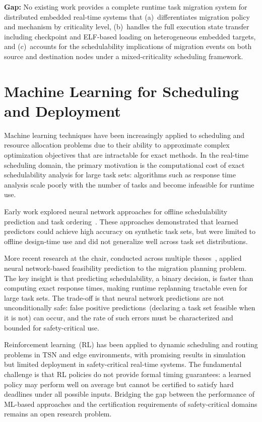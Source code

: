 \textbf{Gap:} No existing work provides a complete runtime task migration system for
distributed embedded real-time systems that (a)~differentiates migration policy and
mechanism by criticality level, (b)~handles the full execution state transfer
including checkpoint and ELF-based loading on heterogeneous embedded targets,
and (c)~accounts for the schedulability implications of migration events on both
source and destination nodes under a mixed-criticality scheduling framework.

\section{Machine Learning for Scheduling and Deployment}
\label{sec:rw_ml}

Machine learning techniques have been increasingly applied to scheduling and resource
allocation problems due to their ability to approximate complex optimization objectives
that are intractable for exact methods. In the real-time scheduling domain, the
primary motivation is the computational cost of exact schedulability analysis for
large task sets: algorithms such as response time analysis scale poorly with the
number of tasks and become infeasible for runtime use.

Early work explored neural network approaches for offline schedulability prediction
and task ordering~\cite{cardeira1994,dominguez2004}. These approaches demonstrated
that learned predictors could achieve high accuracy on synthetic task sets, but were
limited to offline design-time use and did not generalize well across task set
distributions.

More recent research at the chair, conducted across multiple theses~\cite{taieb1,
	utz1,blieninger1}, applied neural network-based feasibility prediction to the
migration planning problem. The key insight is that predicting schedulability, a
binary decision, is faster than computing exact response times, making runtime
replanning tractable even for large task sets. The trade-off is that neural network
predictions are not unconditionally safe: false positive predictions~(declaring a
task set feasible when it is not) can occur, and the rate of such errors must be
characterized and bounded for safety-critical use.

Reinforcement learning~(RL) has been applied to dynamic scheduling and routing
problems in TSN and edge environments, with promising results in simulation but
limited deployment in safety-critical real-time systems. The fundamental challenge
is that RL policies do not provide formal timing guarantees: a learned policy may
perform well on average but cannot be certified to satisfy hard deadlines under all
possible inputs. Bridging the gap between the performance of ML-based approaches
and the certification requirements of safety-critical domains remains an open
research problem.

